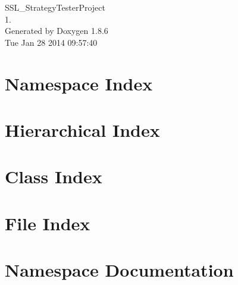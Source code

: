\documentclass[twoside]{book}
\newcommand{\clearemptydoublepage}{%
  \newpage{\pagestyle{empty}\cleardoublepage}%
}
\begin{document}
\hypersetup{pageanchor=false}
\begin{titlepage}
\vspace*{7cm}
\begin{center}%
{\Large S\-S\-L\-\_\-\-Strategy\-Tester\-Project \\[1ex]\large 1. }\\
\vspace*{1cm}
{\large Generated by Doxygen 1.8.6}\\
\vspace*{0.5cm}
{\small Tue Jan 28 2014 09:57:40}\\
\end{center}
\end{titlepage}
\clearemptydoublepage
\tableofcontents
\clearemptydoublepage
{}
\hypersetup{pageanchor=true}

\chapter{Namespace Index}

\chapter{Hierarchical Index}

\chapter{Class Index}

\chapter{File Index}

\chapter{Namespace Documentation}



\end{document}
